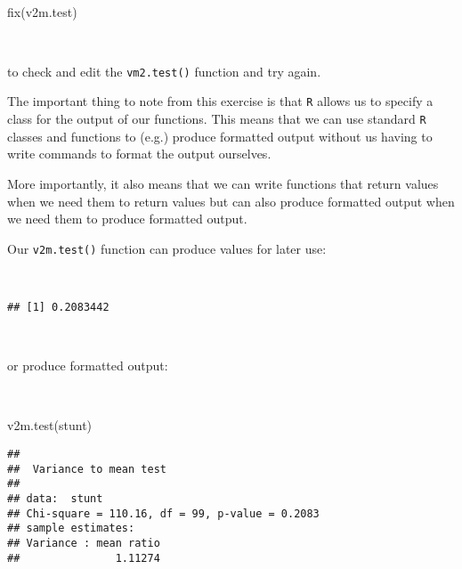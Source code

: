 \documentclass[
  12pt,
  a4paper]{book}
\newenvironment{Shaded}{\begin{snugshade}}{\end{snugshade}}
\newcommand{\FunctionTok}[1]{\textcolor[rgb]{0.00,0.00,0.00}{#1}}
\newcommand{\NormalTok}[1]{#1}
\newcommand{\OtherTok}[1]{\textcolor[rgb]{0.56,0.35,0.01}{#1}}
\newcommand{\SpecialCharTok}[1]{\textcolor[rgb]{0.00,0.00,0.00}{#1}}
\begin{document}
~

\begin{Shaded}
\begin{Highlighting}[]
\FunctionTok{fix}\NormalTok{(v2m.test)}
\end{Highlighting}
\end{Shaded}

~

to check and edit the \texttt{vm2.test()} function and try again.

The important thing to note from this exercise is that \texttt{R} allows us to specify a class for the output of our functions. This means that we can use standard \texttt{R} classes and functions to (e.g.) produce formatted output without us having to write commands to format the output ourselves.

More importantly, it also means that we can write functions that return values when we need them to return values but can also produce formatted output when we need them to produce formatted output.

Our \texttt{v2m.test()} function can produce values for later use:

~

\begin{Shaded}
\end{Shaded}

\begin{verbatim}
## [1] 0.2083442
\end{verbatim}

~

or produce formatted output:

~

\begin{Shaded}
\begin{Highlighting}[]
\FunctionTok{v2m.test}\NormalTok{(stunt)}
\end{Highlighting}
\end{Shaded}

\begin{verbatim}
## 
##  Variance to mean test
## 
## data:  stunt
## Chi-square = 110.16, df = 99, p-value = 0.2083
## sample estimates:
## Variance : mean ratio 
##               1.11274
\end{verbatim}
\end{document}
